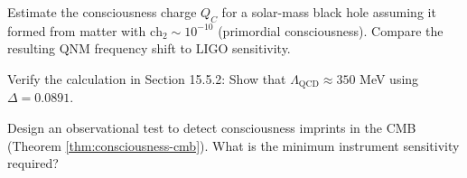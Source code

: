 \begin{exercise}
Estimate the consciousness charge $Q_C$ for a solar-mass black hole assuming it formed from matter with $\text{ch}_2 \sim 10^{-10}$ (primordial consciousness). Compare the resulting QNM frequency shift to LIGO sensitivity.
\end{exercise}

\begin{exercise}
Verify the calculation in Section 15.5.2: Show that $\Lambda_{\text{QCD}} \approx 350$ MeV using $\Delta = 0.0891$.
\end{exercise}

\begin{exercise}
Design an observational test to detect consciousness imprints in the CMB (Theorem \ref{thm:consciousness-cmb}). What is the minimum instrument sensitivity required?
\end{exercise}

